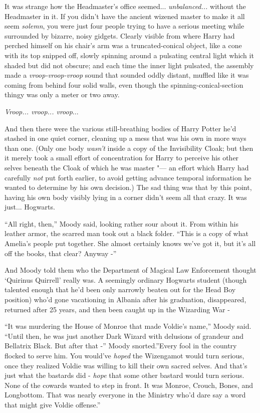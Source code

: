 It was strange how the Headmaster's office seemed...
\emph{unbalanced...} without the Headmaster in it. If you didn't
have the ancient wizened master to make it all seem \emph{solemn}, you
were just four people trying to have a serious meeting while surrounded
by bizarre, noisy gidgets. Clearly visible from where Harry had perched
himself on his chair's arm was a truncated-conical object, like a cone
with its top snipped off, slowly spinning around a pulsating central
light which it shaded but did not obscure; and each time the inner light
pulsated, the assembly made a \emph{vroop-vroop-vroop} sound that
sounded oddly distant, muffled like it was coming from behind four solid
walls, even though the spinning-conical-section thingy was only a meter
or two away.

\emph{Vroop... vroop... vroop}...

And then there were the various still-breathing bodies of Harry Potter
he'd stashed in one quiet corner, cleaning up a mess that was his own in
more ways than one. (Only one body \emph{wasn't} inside a copy of the
Invisibility Cloak; but then it merely took a small effort of
concentration for Harry to perceive his other selves beneath the Cloak
of which he was master "--- an effort which Harry had carefully \emph{not}
put forth earlier, to avoid getting advance temporal information he
wanted to determine by his own decision.) The sad thing was that by this
point, having his own body visibly lying in a corner didn't seem all
that crazy. It was just... Hogwarts.

``All right, then,'' Moody said, looking rather sour about it. From
within his leather armor, the scarred man took out a black folder.
``This is a copy of what Amelia's people put together. She almost
certainly knows we've got it, but it's all off the books, that clear?
Anyway -''

And Moody told them who the Department of Magical Law Enforcement
thought `Quirinus Quirrell' really was. A seemingly ordinary Hogwarts
student (though talented enough that he'd been only narrowly beaten out
for the Head Boy position) who'd gone vacationing in Albania after his
graduation, disappeared, returned after 25 years, and then been caught
up in the Wizarding War -

``It was murdering the House of Monroe that made Voldie's name,'' Moody
said. ``Until then, he was just another Dark Wizard with delusions of
grandeur and Bellatrix Black. But after that -'' Moody snorted.''Every
fool in the country flocked to serve him. You would've \emph{hoped} the
Wizengamot would turn serious, once they realized Voldie was willing to
kill their own sacred selves. And that's just what the bastards did -
\emph{hope} that some other bastard would turn serious. None of the
cowards wanted to step in front. It was Monroe, Crouch, Bones, and
Longbottom. That was nearly everyone in the Ministry who'd dare say a
word that might give Voldie offense.''

